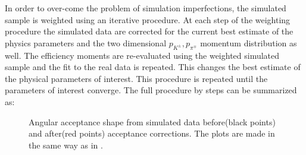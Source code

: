 In order to over-come the problem of simulation imperfections, the simulated sample is weighted using an iterative procedure.
At each step of the weighting procedure the simulated data are corrected for the current best estimate of the physics
parameters and the two dimensional $p_{K^{\pm}},p_{\pi^{\mp}}$ momentum distribution as well.
The efficiency moments are re-evaluated using the weighted simulated sample and the fit to the real data is repeated.
This changes the best estimate of the physical parameters of interest. This procedure is repeated until the parameters
of interest converge. The full procedure by steps can be summarized as:

\begin{figure}[!t]
  \centering
  \begin{subfigure}{0.49\textwidth}
    \scalebox{1.15}{}
    \caption{}
    \label{angAccCor_ctk}
  \end{subfigure}%
  \hfill%
  \begin{subfigure}{0.49\textwidth}
    \scalebox{1.15}{}
    \caption{}
    \label{angAccCorr_ctl}
  \end{subfigure}
  \vspace*{0.02\textwidth}
  \begin{subfigure}{0.49\textwidth}
    \scalebox{1.15}{}
    \caption{}
    \label{angAccCorr_phi}
  \end{subfigure}
  \caption{Angular acceptance shape from simulated data before(black points) and after(red points) acceptance corrections.
           The plots are made in the same way as in .}
  \label{angAggCorrections}
\end{figure}


